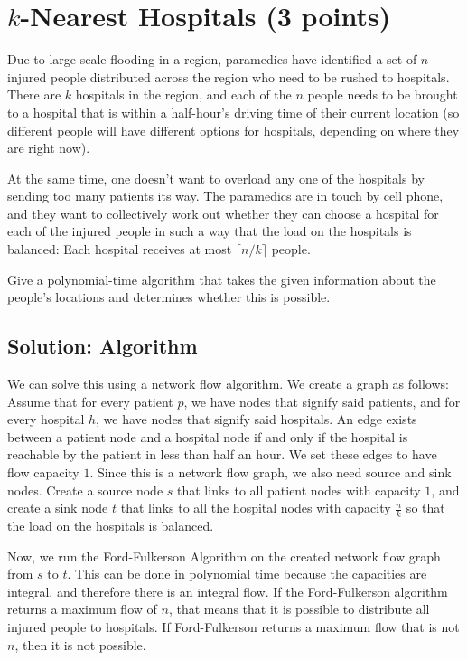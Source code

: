 \documentclass[letter,11pt]{article}
\begin{document}
\section{$k$-Nearest Hospitals (3 points)}

Due to large-scale flooding in a region, paramedics have identified a set of $n$ injured people distributed across the region who need to be rushed to hospitals. There are $k$ hospitals in the region, and each of the $n$ people needs to be brought to a hospital that is within a half-hour’s driving time of their current location (so different people will have different options for hospitals, depending on where they are right now).


At the same time, one doesn’t want to overload any one of the hospitals by sending too many patients its way. The paramedics are in touch by cell phone, and they want to collectively work out whether they can choose a hospital for each of the injured people in such a way that the load on the hospitals is balanced: Each hospital receives at most $\lceil n/k \rceil$ people.

 Give a polynomial-time algorithm that takes the given information about the people’s locations and determines whether this is possible.

\subsection{Solution: Algorithm}

We can solve this using a network flow algorithm. We create a graph as follows: Assume that for every patient $p$, we have nodes that signify said patients, and for every hospital $h$, we have nodes that signify said hospitals. An edge exists between a patient node and a hospital node if and only if the hospital is reachable by the patient in less than half an hour. We set these edges to have flow capacity $1$. Since this is a network flow graph, we also need source and sink nodes. Create a source node $s$ that links to all patient nodes with capacity $1$, and create a sink node $t$ that links to all the hospital nodes with capacity $\frac{n}{k}$ so that the load on the hospitals is balanced.

Now, we run the Ford-Fulkerson Algorithm on the created network flow graph from $s$ to $t$. This can be done in polynomial time because the capacities are integral, and therefore there is an integral flow. If the Ford-Fulkerson algorithm returns a maximum flow of $n$, that means that it is possible to distribute all injured people to hospitals. If Ford-Fulkerson returns a maximum flow that is not $n$, then it is not possible.
\end{document}
